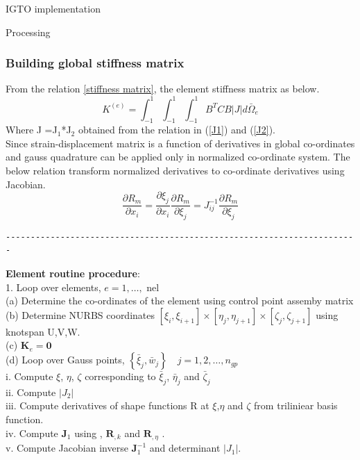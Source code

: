 \documentclass[a4paper,12pt,times]{article}
\begin{document}
\begin{section}{IGTO implementation}
\begin{subsection}{Processing}
\subsubsection{Building global stiffness matrix}
From the relation \ref{stiffness matrix}, the element stiffness matrix as below.
\begin{equation}
K^{(e)}=\int_{-1}^{1} \int_{-1}^{1} \int_{-1}^{1} B^{T} C B|J| d \bar{\Omega}_{e}
\end{equation}
Where J =J${_1}$*J${_2}$ obtained from the relation in (\ref{J1}) and (\ref{J2}).\\
Since strain-displacement matrix is a function of derivatives in global co-ordinates and gauss quadrature can be applied only in normalized co-ordinate system. The below relation transform normalized derivatives to co-ordinate derivatives using Jacobian.
\begin{equation}
\frac{\partial R_{m}}{\partial x_{i}}=\frac{\partial \xi_{j}}{\partial x_{i}} \frac{\partial R_{m}}{\partial \xi_{j}}=J_{i j}^{-1} \frac{\partial R_{m}}{\partial \xi_{j}}
\end{equation}
\begin{verbatim}
-----------------------------------------------------------------------
\end{verbatim}
\textbf{Element routine procedure}:\\
1. Loop over elements, $e=1, \ldots,$ nel\\
(a) Determine the co-ordinates of the element using control point assemby matrix\\
(b)  Determine NURBS coordinates $\left[\xi_{i}, \xi_{i+1}\right] \times\left[\eta_{j}, \eta_{j+1}\right] \times\left[\zeta_{j}, \zeta_{j+1}\right]$ using knotspan U,V,W.\\
(c) $\mathbf{K}_{e}=\mathbf{0}$\\
(d) Loop over Gauss points, $\left\{\bar{\xi}_{j}, \bar{w}_{j}\right\} \quad j=1,2, \ldots, n_{g p}$\\
i. Compute $\xi$, $\eta$, $\zeta$   corresponding to $\bar{\xi}_{j}$, $\bar{\eta}_{j}$ and  $\bar{\zeta}_{j}$  \\
ii. Compute $\left|J_{2}\right|$ \\
iii. Compute derivatives of shape functions R at $\xi$,$\eta$ and $\zeta$ from triliniear basis function.\\
iv. Compute $\mathbf{J}_{1}$ using , $\mathbf{R}_{, k}$ and $\mathbf{R}_{, \eta}$ .\\
v. Compute Jacobian inverse $\mathbf{J}_{1}^{-1}$ and determinant $\left|J_{1}\right|$.\\

\end{subsection}
\end{section}
\end{document}
